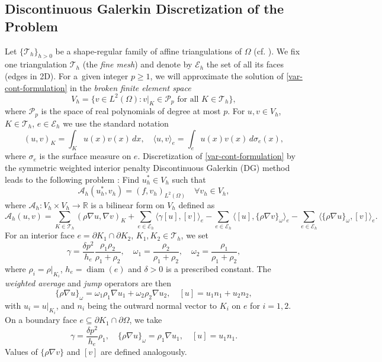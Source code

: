 \documentclass[11pt]{article}
\theoremstyle{definition}
\theoremstyle{theorem}
\begin{document}
\subsection{Discontinuous Galerkin Discretization of the Problem}
\label{sec:discretization}

Let $\{\mathcal{T}_h\}_{h>0}$ be a shape-regular family of affine
triangulations of $\Omega$ (cf. \cite[Definitions 1.53, 1.107]{Ern-FEM}).
We fix one triangulation $\mathcal{T}_h$ (the \emph{fine mesh}) and
denote by $\mathcal{E}_h$ the set of all its faces (edges in 2D).
For a~given integer $p\geq 1$, we will approximate the solution of \eqref{var-cont-formulation}
in the \emph{broken finite element space}
\[
  V_h = \{v \in L^2(\Omega) : v|_K \in \mathcal{P}_p \text{ for all } K\in \mathcal{T}_h\},
\]
where $\mathcal{P}_p$ is the space of real polynomials of degree at most $p$.
For $u, v\in V_h$, $K\in \mathcal{T}_h$, $e\in \mathcal{E}_h$ we use
the standard notation
\[
  (u, v)_K = \int_K u(x) v(x)\, dx,\quad \langle u, v \rangle_e = \int_e u(x) v(x)\, d\sigma_e(x),
\]
where $\sigma_e$ is the surface measure on $e$. Discretization of
\eqref{var-cont-formulation} by the symmetric weighted interior penalty
Discontinuous Galerkin (DG) method leads to the following problem \cite{Przykry, Ern-weighted-dg}:
Find $u_h^* \in V_h$ such that
\begin{equation}
  \mathcal{A}_h(u_h^*, v_h) = (f, v_h)_{L^2(\Omega)} \quad \forall v_h \in V_h,\label{var-formulation}
\end{equation}
where $\mathcal{A}_h: V_h \times V_h \to \mathbb{R}$ is a bilinear form on $V_h$ defined as
\begin{equation}
\mathcal{A}_h(u, v) = \sum_{K\in \mathcal{T}_h} \left(\rho \nabla u, \nabla v\right)_K
  + \sum_{e\in \mathcal{E}_h} \langle \gamma [u], [v]\rangle_e
  - \sum_{e\in \mathcal{E}_h} \langle [u], \{\rho \nabla v\}_\omega\rangle_e
  - \sum_{e\in \mathcal{E}_h} \langle \{\rho \nabla u\}_\omega, [v] \rangle_e.
  \label{A_h_def}
\end{equation}
For an interior face $e=\partial K_1 \cap \partial K_2$, $K_1, K_2 \in \mathcal{T}_h$, we set
\[
  \gamma = \frac{\delta p^2}{h_e}\frac{\rho_1 \rho_2}{\rho_1 + \rho_2},\quad
  \omega_1 = \frac{\rho_2}{\rho_1 + \rho_2},\quad
  \omega_2 = \frac{\rho_1}{\rho_1 + \rho_2},
\]
where $\rho_i=\rho|_{K_i}$, $h_e=\operatorname{diam}(e)$ and $\delta>0$ is a prescribed constant.
The \emph{weighted average} and \emph{jump} operators are then
\[
  \{\rho \nabla u\}_{\omega} = \omega_1 \rho_1 \nabla u_1 + \omega_2 \rho_2 \nabla u_2,\quad
  [u] = u_1 n_1 + u_2 n_2,
\]
with $u_i=u|_{K_i}$, and $n_i$ being the outward normal
vector to $K_i$ on $e$ for $i=1,2$. On a boundary face $e\subseteq \partial K_1\cap \partial \Omega$,
we take
\[
  \gamma = \frac{\delta p^2}{h_e}\rho_1,\quad
  \{\rho \nabla u\}_\omega = \rho_1 \nabla u_1,\quad
  [u] = u_1 n_1.
\]
Values of $\{\rho \nabla v\}$ and $[v]$ are defined analogously.
\end{document}
